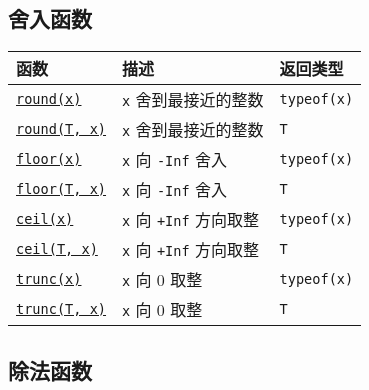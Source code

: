 \subsection{舍入函数}




\begin{table}[h]

\begin{tabulary}{\linewidth}{|L|L|L|}
\hline
函数 & 描述 & 返回类型 \\
\hline
\hyperlink{12930779325193350739}{\texttt{round(x)}} & \texttt{x} 舍到最接近的整数 & \texttt{typeof(x)} \\
\hline
\hyperlink{12930779325193350739}{\texttt{round(T, x)}} & \texttt{x} 舍到最接近的整数 & \texttt{T} \\
\hline
\hyperlink{11115257331910840693}{\texttt{floor(x)}} & \texttt{x} 向 \texttt{-Inf} 舍入 & \texttt{typeof(x)} \\
\hline
\hyperlink{11115257331910840693}{\texttt{floor(T, x)}} & \texttt{x} 向 \texttt{-Inf} 舍入 & \texttt{T} \\
\hline
\hyperlink{10519509038312853061}{\texttt{ceil(x)}} & \texttt{x} 向 \texttt{+Inf} 方向取整 & \texttt{typeof(x)} \\
\hline
\hyperlink{10519509038312853061}{\texttt{ceil(T, x)}} & \texttt{x} 向 \texttt{+Inf} 方向取整 & \texttt{T} \\
\hline
\hyperlink{1728363361565303194}{\texttt{trunc(x)}} & \texttt{x} 向 0 取整 & \texttt{typeof(x)} \\
\hline
\hyperlink{1728363361565303194}{\texttt{trunc(T, x)}} & \texttt{x} 向 0 取整 & \texttt{T} \\
\hline
\end{tabulary}

\end{table}



\hypertarget{3613448754755213273}{}


\subsection{除法函数}




